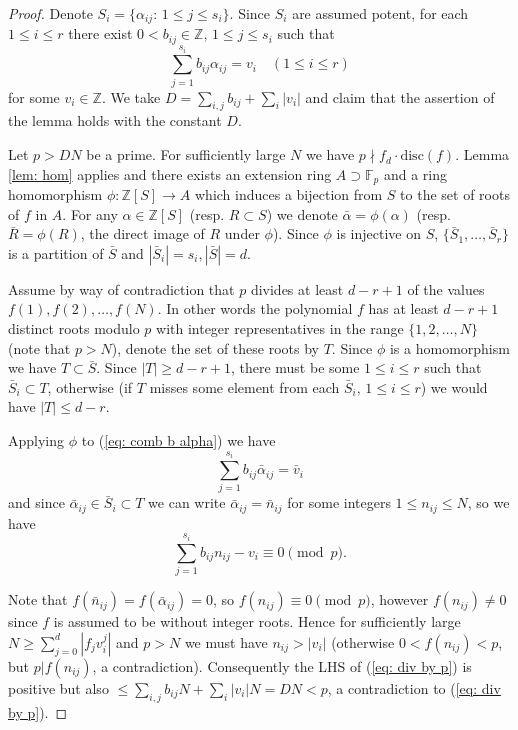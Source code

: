 \documentclass[alphabetic]{amsart}
\theoremstyle{definition}
\numberwithin{equation}{section}
\newcommand{\F}{{\mathbb F}}
\newcommand{\Z}{{\mathbb Z}}
\newcommand{\disc}{{\mathrm{disc}}}
\numberwithin{equation}{section}
\begin{document}
\begin{proof}
Denote $S_i=\{\alpha_{ij}:\,1\le j\le s_i\}$. Since $S_i$ are assumed potent, for each $1\le i\le r$ there exist $0< b_{ij}\in\Z,\,1\le j\le s_i$ such that \begin{equation}\label{eq: comb b alpha}\sum_{j=1}^{s_i}b_{ij}\alpha_{ij}={v_{i}}\quad (1\le i\le r)\end{equation} for some $v_{i}\in\Z$.
We take $D=\sum_{i,j}b_{ij}+\sum_i|v_i|$ and claim that the assertion of the lemma holds with the constant $D$.

Let $p>DN$ be a prime. For sufficiently large $N$ we have $p\nmid f_d\cdot\disc(f)$. Lemma \ref{lem: hom} applies and there exists an extension ring $A\supset\F_p$ and a ring homomorphism $\phi:\Z[S]\to A$ which induces a bijection from $S$ to the set of roots of $f$ in $A$. For any $\alpha\in\Z[S]$ (resp. $R\subset S$) we denote $\bar\alpha=\phi(\alpha)$ (resp. $\bar R=\phi(R)$, the direct image of $R$ under $\phi$). Since $\phi$ is injective on $S$, $\{\bar S_1,\ldots,\bar S_r\}$ is a partition of $\bar S$ and $|\bar S_i|=s_i,|\bar S|=d$.

Assume by way of contradiction that $p$ divides at least $d-r+1$ of the values $f(1),f(2),\ldots,f(N)$. In other words the polynomial $f$ has at least $d-r+1$ distinct roots modulo $p$ with integer representatives in the range $\{1,2,\ldots,N\}$ (note that $p>N$), denote the set of these roots by $T$. Since $\phi$ is a homomorphism we have $T\subset \bar S$. Since $|T|\ge d-r+1$, there must be some $1\le i\le r$ such that $\bar S_i\subset T$, otherwise (if $T$ misses some element from each $\bar S_i,\,1\le i\le r$) we would have $|T|\le d-r$.

Applying $\phi$ to (\ref{eq: comb b alpha}) we have 
$$\sum_{j=1}^{s_i}b_{ij}\bar\alpha_{ij}=\bar v_i$$
and since $\bar\alpha_{ij}\in\bar S_i\subset T$ we can write $\bar\alpha_{ij}=\bar n_{ij}$ for some integers $1\le n_{ij}\le N$, so we have
\begin{equation}\label{eq: div by p}\sum_{j=1}^{s_i}b_{ij}n_{ij}-v_i\equiv 0\pmod p.\end{equation}

Note that $f(\bar n_{ij})=f(\bar\alpha_{ij})=0$, so $f(n_{ij})\equiv 0\pmod p$, however $f(n_{ij})\neq 0$ since $f$ is assumed to be without integer roots. Hence for sufficiently large $N\ge\sum_{j=0}^d|f_jv_i^j|$ and $p>N$ we must have $n_{ij}>|v_i|$ (otherwise $0<f(n_{ij})<p$, but $p|f(n_{ij})$, a contradiction). Consequently the LHS of (\ref{eq: div by p}) is positive but also $\le \sum_{i,j}b_{ij}N+\sum_i|v_i|N=DN<p$, a contradiction to (\ref{eq: div by p}). 

\end{proof}
\end{document}

